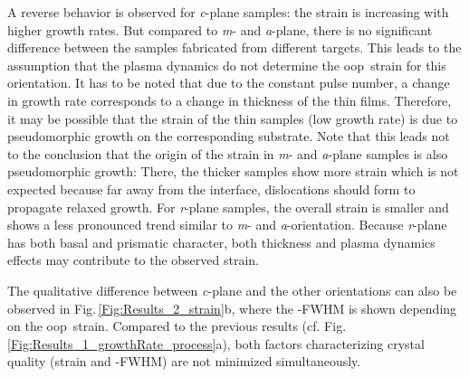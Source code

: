 A reverse behavior is observed for \textit{c}-plane samples: the strain is increasing with higher growth rates.
But compared to \textit{m}- and \textit{a}-plane, there is no significant difference between the samples fabricated from different targets.
This leads to the assumption that the plasma dynamics do not determine the \gls{oop}\ strain for this orientation.
It has to be noted that due to the constant pulse number, a change in growth rate corresponds to a change in thickness of the thin films.
Therefore, it may be possible that the strain of the thin samples (low growth rate) is due to pseudomorphic growth on the corresponding  substrate.
Note that this leads not to the conclusion that the origin of the strain in \textit{m}- and \textit{a}-plane samples is also pseudomorphic growth:
There, the thicker samples show more strain which is not expected because far away from the interface, dislocations should form to propagate relaxed growth.
For \textit{r}-plane samples, the overall strain is smaller and shows a less pronounced trend similar to \textit{m}- and \textit{a}-orientation.
Because \textit{r}-plane has both basal and prismatic character, both thickness and plasma dynamics effects may contribute to the observed strain.

The qualitative difference between \textit{c}-plane and the other orientations can also be observed in Fig.\,\ref{Fig:Results_2_strain}b, where the \textomega-FWHM is shown depending on the \gls{oop}\ strain.
Compared to the previous results (cf. Fig.\,\ref{Fig:Results_1_growthRate_process}a), both factors characterizing crystal quality (strain and \textomega-FWHM) are not minimized simultaneously.